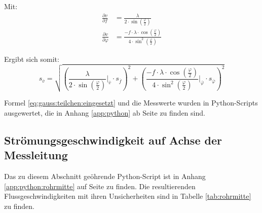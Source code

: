 Mit:
\begin{align}
    \label{eq:partials}
    \frac{\partial v}{\partial f}       &= \frac{\lambda}{2 \cdot \sin \left( \frac{\varphi}{2} \right) } \\
    \frac{\partial v}{\partial \varphi} &= \frac{-f \cdot \lambda \cdot \cos\left(\frac{\varphi}{2}\right)}{4 \cdot \sin^2\left(\frac{\varphi}{2}\right)}
\end{align}

Ergibt sich somit:
\begin{equation}
    \label{eq:gauss:teilchen:eingesetzt}
    s_{\overline{v}} = \sqrt{ \left( \frac{\lambda}                                                    {2 \cdot \sin  \left( \frac{\varphi}{2} \right)} \biggr\rvert_{\overline{v}}       \cdot s_{\overline{f}}       \right)^2
                            + \left( \frac{-f \cdot \lambda \cdot \cos\left( \frac{\varphi}{2} \right)}{4 \cdot \sin^2\left( \frac{\varphi}{2} \right)} \biggr\rvert_{\overline{\varphi}} \cdot s_{\overline{\varphi}} \right)^2
                            }
\end{equation}

Formel   \ref{eq:gauss:teilchen:eingesetzt}  und   die  Messwerte   wurden  in
Python-Scripts   ausgewertet,  die   in  Anhang   \ref{app:python}  ab   Seite
\pageref{app:python} zu finden sind.



\clearpage
\subsection{Str\"omungsgeschwindigkeit auf Achse der Messleitung}
\label{subsec:achse}


Das   zu   diesem   Abschnitt   ge\"ohrende  Python-Script   ist   in   Anhang
\ref{app:python:rohrmitte}   auf   Seite   \pageref{app:python:rohrmitte}   zu
finden. Die  resultierenden  Flussgeschwindigkeiten mit  ihren  Unsicherheiten
sind in Tabelle \ref{tab:rohrmitte} zu finden.

